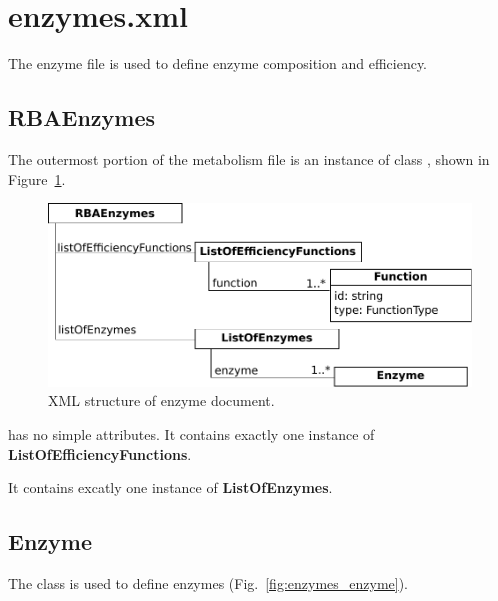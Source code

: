 
\section{enzymes.xml}

The enzyme file is used to define enzyme composition and efficiency.

\subsection{RBAEnzymes}
\label{sec:rba_enzymes}

The outermost portion of the metabolism file is an instance of class
\rbaenzymes, shown in Figure~\ref{fig:enzymes_doc}.

\begin{figure}
  \centering
  \includegraphics[scale=0.8]{figures/enzymes_doc}
  \caption{XML structure of enzyme document.}
\label{fig:enzymes_doc}
\end{figure}

\rbaenzymes{} has no simple attributes.
It contains exactly one instance of \textbf{ListOfEfficiencyFunctions}.

It contains excatly one instance of \textbf{ListOfEnzymes}.


\subsection{Enzyme}
\label{sec:enzyme}

The \enzyme{} class is used to define enzymes
(Fig.~\ref{fig:enzymes_enzyme}).

